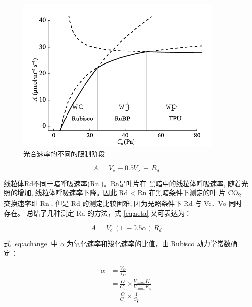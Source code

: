 \documentclass[]{krantz}
\theoremstyle{definition}
\theoremstyle{definition}
\theoremstyle{definition}
\theoremstyle{remark}
\begin{document}
\begin{figure}
\includegraphics[width=1\linewidth]{images/fvcb} \caption{光合速率的不同的限制阶段}\label{fig:fvcb}
\end{figure}

\begin{equation}
A\ =V_{c}\ -0.5V_{o}\ -\ R_{d}
\label{eq:aeta}
\end{equation}

线粒体Rd不同于暗呼吸速率(Rn )。Rn是叶片在 黑暗中的线粒体呼吸速率,
随着光照的增加, 线粒体呼吸速率下降。因此 Rd \textless{} Rn
在黑暗条件下测定的叶 片 CO\textsubscript{2} 交换速率即 Rn , 但是 Rd
的测定比较困难, 因为光照条件下 Rd 与 Vc、Vo
同时存在。\citet{Hikosaka2006Temperature} 总结了几种测定 Rd 的方法，式
\eqref{eq:aeta} 又可表达为：

\begin{equation}
A\ =V_{c}\ (1\ -0.5\alpha)\ R_{d}
\label{eq:achange}
\end{equation}

式 \eqref{eq:achange} 中 \(\alpha\) 为氧化速率和羧化速率的比值，由 Rubisco
动力学常数确定：

\begin{equation}
\begin{split}
\alpha & =\frac{V_{O}}{V_{C}}\\
& = \frac{O}{C_c} \times \frac{V_{omax} K_c}{V_{cmax}K_{o}}\\
& = \frac{O}{C_{c}} \times \frac{1}{S_{\frac{c}{o}}}
\end{split}
\label{eq:dynamic}
\end{equation}
\end{document}
